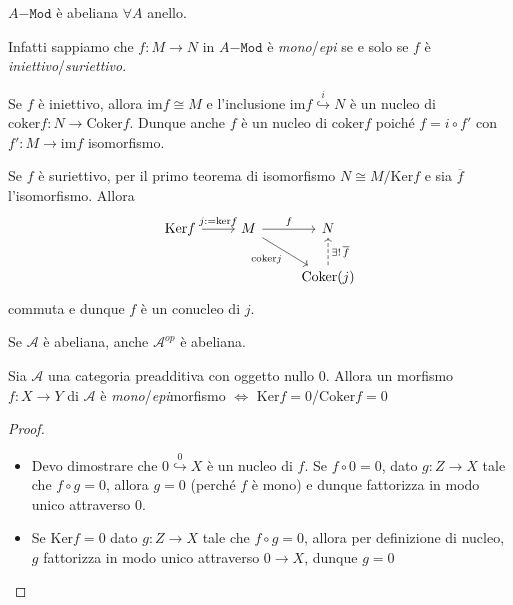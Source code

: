 \begin{example}{}
    \(A\mathtt{-Mod}\) è abeliana \(\forall A\) anello.

    Infatti sappiamo che \(f : M \to N\) in \(A\mathtt{-Mod}\) è \emph{mono}/\emph{epi} se
    e solo se \(f\) è \emph{iniettivo}/\emph{suriettivo}.

    Se \(f\) è iniettivo, allora \(\mathrm{im}f \cong M\) e l'inclusione \(\mathrm{im}f \overset{i}{\hookrightarrow } N\) è un nucleo di \(\mathrm{coker}f : N \to \mathrm{Coker}f\). 
    Dunque anche \(f\) è un nucleo di \(\mathrm{coker}f\) poiché \(f = i \circ f'\) con \(f' : M \to \mathrm{im}f\) isomorfismo.

    Se \(f\) è suriettivo, per il primo teorema di isomorfismo \(N \cong M / \mathrm{Ker}f\) e sia 
    \(\overline{f}\) l'isomorfismo. Allora
\[\begin{tikzcd}
	{\mathrm{Ker}f} & M & N \\
	&& {\mathrm{Coker}(j)}
	\arrow["{j:=\mathrm{ker}f}", from=1-1, to=1-2]
	\arrow["f", from=1-2, to=1-3]
	\arrow["{\mathrm{coker}j}"', from=1-2, to=2-3]
	\arrow["{\exists!\,\overline{f}}"', dashed, from=2-3, to=1-3]
\end{tikzcd}\]
    commuta e dunque \(f\) è un conucleo di \(j\).
\end{example}

\begin{remark}{}
    Se \(\mathcal{A}\) è abeliana, anche \(\mathcal{A}^{op}\) è abeliana.
\end{remark}

\begin{proposition}{}
    Sia \(\mathcal{A}\) una categoria preadditiva con oggetto nullo \(0\).
    Allora un morfismo \(f : X \to Y\) di \(\mathcal{A}\) è
    \emph{mono}/\emph{epi}morfismo \(\iff\) \emph{\(\mathrm{Ker}f =
    0\)}/\emph{\(\mathrm{Coker}f = 0\)}
\end{proposition}
\begin{proof}\( \)
\begin{itemize}
    \item[\(\implies \)] Devo dimostrare che \(0 \overset{0}{\hookrightarrow }X \) è un nucleo di \(f\).
        Se \(f \circ 0 = 0\), dato \(g : Z \to X\) tale che \(f \circ g = 0\),
        allora \(g = 0\) (perché \(f\) è mono) e dunque fattorizza in modo unico
        attraverso \(0\).
    \item[\(\impliedby \)] Se \(\mathrm{Ker}f = 0\) dato \(g : Z \to X\) tale
        che \(f \circ g = 0\), allora per definizione di nucleo, \(g\) fattorizza in modo unico attraverso \(0 \to X\), dunque \(g = 0\) 
\end{itemize}
\end{proof}

